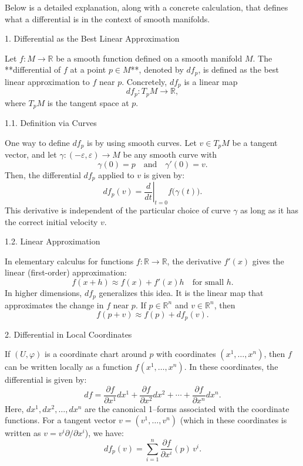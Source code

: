 \documentclass[11pt,openany]{article}
\begin{document}
Below is a detailed explanation, along with a concrete calculation, that defines what a differential is in the context of smooth manifolds.

 1. Differential as the Best Linear Approximation

Let \( f \colon M \to \mathbb{R} \) be a smooth function defined on a smooth manifold \(M\). The **differential of \( f \) at a point \( p \in M \)**, denoted by \( df_p \), is defined as the best linear approximation to \( f \) near \( p \). Concretely, \( df_p \) is a linear map
\[
df_p \colon T_pM \to \mathbb{R},
\]
where \( T_pM \) is the tangent space at \( p \).

 1.1. Definition via Curves

One way to define \( df_p \) is by using smooth curves. Let \( v \in T_pM \) be a tangent vector, and let \(\gamma \colon (-\varepsilon,\varepsilon) \to M\) be any smooth curve with
\[
\gamma(0) = p \quad \text{and} \quad \gamma'(0) = v.
\]
Then, the differential \( df_p \) applied to \( v \) is given by:
\[
df_p(v) = \left. \frac{d}{dt} \right|_{t=0} f\bigl(\gamma(t)\bigr).
\]
This derivative is independent of the particular choice of curve \(\gamma\) as long as it has the correct initial velocity \( v \).

 1.2. Linear Approximation

In elementary calculus for functions \( f \colon \mathbb{R} \to \mathbb{R} \), the derivative \( f'(x) \) gives the linear (first-order) approximation:
\[
f(x+h) \approx f(x) + f'(x)h \quad \text{for small } h.
\]
In higher dimensions, \( df_p \) generalizes this idea. It is the linear map that approximates the change in \( f \) near \( p \). If \( p \in \mathbb{R}^n \) and \( v \in \mathbb{R}^n \), then
\[
f(p+v) \approx f(p) + df_p(v).
\]

2. Differential in Local Coordinates

If \( (U, \varphi) \) is a coordinate chart around \( p \) with coordinates \( (x^1,\dots,x^n) \), then \( f \) can be written locally as a function \( f(x^1,\dots,x^n) \). In these coordinates, the differential is given by:
\[
df = \frac{\partial f}{\partial x^1} dx^1 + \frac{\partial f}{\partial x^2} dx^2 + \cdots + \frac{\partial f}{\partial x^n} dx^n.
\]
Here, \( dx^1, dx^2, \dots, dx^n \) are the canonical 1–forms associated with the coordinate functions. For a tangent vector \( v = (v^1,\dots,v^n) \) (which in these coordinates is written as \( v = v^i \partial/\partial x^i \)), we have:
\[
df_p(v) = \sum_{i=1}^n \frac{\partial f}{\partial x^i}(p)\, v^i.
\]
\end{document}
